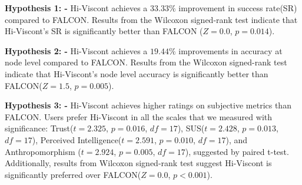 \noindent\textbf{Hypothesis 1: -} Hi-Viscont achieves a $33.33\%$ improvement in success rate(SR) compared to FALCON. Results from the Wilcoxon signed-rank test indicate that Hi-Viscont's SR is significantly better than FALCON ($Z=0.0$, $p=0.014$).

\noindent\textbf{Hypothesis 2: -} Hi-Viscont achieves a $19.44\%$ improvements in accuracy at node level compared to FALCON. Results from the Wilcoxon signed-rank test indicate that Hi-Viscont's node level accuracy is significantly better than FALCON($Z=1.5$, $p=0.005$).

\noindent\textbf{Hypothesis 3: -} Hi-Viscont achieves higher ratings on subjective metrics than FALCON. Users prefer Hi-Viscont in all the scales that we measured with significance: Trust($t=2.325$, $p=0.016$, $df=17$), SUS($t=2.428$, $p=0.013$, $df=17$), Perceived Intelligence($t=2.591$, $p=0.010$, $df=17$), and Anthropomorphism ($t=2.924$, $p=0.005$, $df=17$), suggested by paired t-test. Additionally, results from Wilcoxon signed-rank test suggest Hi-Viscont is significantly preferred over FALCON($Z=0.0$, $p<0.001$).

